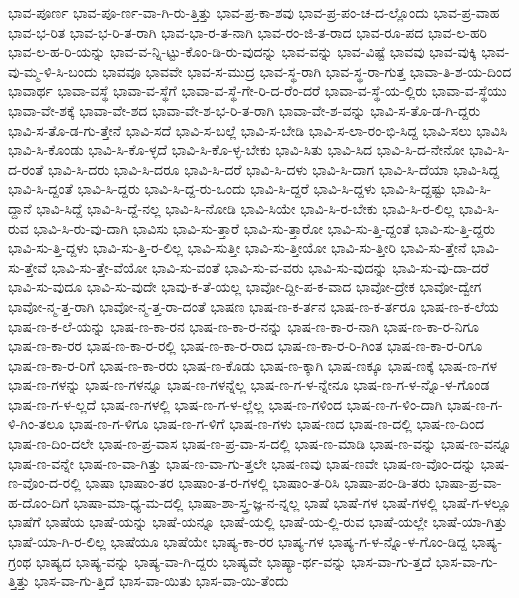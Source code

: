 {ಭಾವ-ಪೂರ್ಣ
ಭಾವ-ಪೂ-ರ್ಣ-ವಾ-ಗಿ-ರು-ತ್ತಿತ್ತು
ಭಾವ-ಪ್ರ-ಕಾ-ಶವು
ಭಾವ-ಪ್ರ-ಪಂ-ಚ-ದ-ಲ್ಲೊಂದು
ಭಾವ-ಪ್ರ-ವಾಹ
ಭಾವ-ಭ-ರಿತ
ಭಾವ-ಭ-ರಿ-ತ-ರಾಗಿ
ಭಾವ-ಭಾ-ರ-ತ-ನಾಗಿ
ಭಾವ-ರಂ-ಜಿ-ತ-ರಾದ
ಭಾವ-ರೂ-ಪದ
ಭಾವ-ಲ-ಹರಿ
ಭಾವ-ಲ-ಹ-ರಿ-ಯನ್ನು
ಭಾವ-ವ-ನ್ನಿ-ಟ್ಟು-ಕೊಂ-ಡಿ-ರು-ವುದನ್ನು
ಭಾವ-ವನ್ನು
ಭಾವ-ವಿಷ್ಟೆ
ಭಾವವು
ಭಾವ-ವುಕ್ಕಿ
ಭಾವ-ವು-ಮ್ಮ-ಳಿ-ಸಿ-ಬಂದು
ಭಾವವೂ
ಭಾವವೇ
ಭಾವ-ಸ-ಮುದ್ರ
ಭಾವ-ಸ್ಥ-ರಾಗಿ
ಭಾವ-ಸ್ಥ-ರಾ-ಗುತ್ತ
ಭಾವಾ-ತಿ-ಶ-ಯ-ದಿಂದ
ಭಾವಾರ್ಥ
ಭಾವಾ-ವಸ್ಥೆ
ಭಾವಾ-ವ-ಸ್ಥೆಗೆ
ಭಾವಾ-ವ-ಸ್ಥೆ-ಗೇ-ರಿ-ದ-ರೆಂ-ದರೆ
ಭಾವಾ-ವ-ಸ್ಥೆ-ಯ-ಲ್ಲಿರು
ಭಾವಾ-ವ-ಸ್ಥೆಯು
ಭಾವಾ-ವೇ-ಶಕ್ಕೆ
ಭಾವಾ-ವೇ-ಶದ
ಭಾವಾ-ವೇ-ಶ-ಭ-ರಿ-ತ-ರಾಗಿ
ಭಾವಾ-ವೇ-ಶ-ವನ್ನು
ಭಾವಿ-ಸ-ತೊ-ಡ-ಗಿ-ದ್ದರು
ಭಾವಿ-ಸ-ತೊ-ಡ-ಗು-ತ್ತೇನೆ
ಭಾವಿ-ಸದೆ
ಭಾವಿ-ಸ-ಬಲ್ಲೆ
ಭಾವಿ-ಸ-ಬೇಡಿ
ಭಾವಿ-ಸ-ಲಾ-ರಂ-ಭಿ-ಸಿದ್ದ
ಭಾವಿ-ಸಲು
ಭಾವಿಸಿ
ಭಾವಿ-ಸಿ-ಕೊಂಡು
ಭಾವಿ-ಸಿ-ಕೊ-ಳ್ಳದೆ
ಭಾವಿ-ಸಿ-ಕೊ-ಳ್ಳ-ಬೇಕು
ಭಾವಿ-ಸಿತು
ಭಾವಿ-ಸಿದ
ಭಾವಿ-ಸಿ-ದ-ನೇನೋ
ಭಾವಿ-ಸಿ-ದ-ರಂತೆ
ಭಾವಿ-ಸಿ-ದರು
ಭಾವಿ-ಸಿ-ದರೂ
ಭಾವಿ-ಸಿ-ದರೆ
ಭಾವಿ-ಸಿ-ದಳು
ಭಾವಿ-ಸಿ-ದಾಗ
ಭಾವಿ-ಸಿ-ದೆಯಾ
ಭಾವಿ-ಸಿದ್ದ
ಭಾವಿ-ಸಿ-ದ್ದಂತೆ
ಭಾವಿ-ಸಿ-ದ್ದರು
ಭಾವಿ-ಸಿ-ದ್ದ-ರು-ಒಂದು
ಭಾವಿ-ಸಿ-ದ್ದರೆ
ಭಾವಿ-ಸಿ-ದ್ದಳು
ಭಾವಿ-ಸಿ-ದ್ದಷ್ಟು
ಭಾವಿ-ಸಿ-ದ್ದಾನೆ
ಭಾವಿ-ಸಿದ್ದೆ
ಭಾವಿ-ಸಿ-ದ್ದೆ-ನಲ್ಲ
ಭಾವಿ-ಸಿ-ನೋಡಿ
ಭಾವಿ-ಸಿಯೇ
ಭಾವಿ-ಸಿ-ರ-ಬೇಕು
ಭಾವಿ-ಸಿ-ರ-ಲಿಲ್ಲ
ಭಾವಿ-ಸಿ-ರುವ
ಭಾವಿ-ಸಿ-ರು-ವು-ದಾಗಿ
ಭಾವಿಸು
ಭಾವಿ-ಸು-ತ್ತಾರೆ
ಭಾವಿ-ಸು-ತ್ತಾರೋ
ಭಾವಿ-ಸು-ತ್ತಿ-ದ್ದಂತೆ
ಭಾವಿ-ಸು-ತ್ತಿ-ದ್ದರು
ಭಾವಿ-ಸು-ತ್ತಿ-ದ್ದಳು
ಭಾವಿ-ಸು-ತ್ತಿ-ರ-ಲಿಲ್ಲ
ಭಾವಿ-ಸುತ್ತೀ
ಭಾವಿ-ಸು-ತ್ತೀಯೋ
ಭಾವಿ-ಸು-ತ್ತೀರಿ
ಭಾವಿ-ಸು-ತ್ತೇನೆ
ಭಾವಿ-ಸು-ತ್ತೇವೆ
ಭಾವಿ-ಸು-ತ್ತೇ-ವೆಯೋ
ಭಾವಿ-ಸು-ವಂತೆ
ಭಾವಿ-ಸು-ವ-ವರು
ಭಾವಿ-ಸು-ವುದನ್ನು
ಭಾವಿ-ಸು-ವು-ದಾ-ದರೆ
ಭಾವಿ-ಸು-ವುದೂ
ಭಾವಿ-ಸು-ವುದೇ
ಭಾವು-ಕ-ತೆ-ಯಲ್ಲ
ಭಾವೋ-ದ್ದೀ-ಪ-ಕ-ವಾದ
ಭಾವೋ-ದ್ರೇಕ
ಭಾವೋ-ದ್ವೇಗ
ಭಾವೋ-ನ್ಮ-ತ್ತ-ರಾಗಿ
ಭಾವೋ-ನ್ಮ-ತ್ತ-ರಾ-ದಂತೆ
ಭಾಷಣ
ಭಾಷ-ಣ-ಕ-ರ್ತನ
ಭಾಷ-ಣ-ಕ-ರ್ತರೂ
ಭಾಷ-ಣ-ಕ-ಲೆಯ
ಭಾಷ-ಣ-ಕ-ಲೆ-ಯನ್ನು
ಭಾಷ-ಣ-ಕಾ-ರನ
ಭಾಷ-ಣ-ಕಾ-ರ-ನನ್ನು
ಭಾಷ-ಣ-ಕಾ-ರ-ನಾಗಿ
ಭಾಷ-ಣ-ಕಾ-ರ-ನಿಗೂ
ಭಾಷ-ಣ-ಕಾ-ರರ
ಭಾಷ-ಣ-ಕಾ-ರ-ರಲ್ಲಿ
ಭಾಷ-ಣ-ಕಾ-ರ-ರಾದ
ಭಾಷ-ಣ-ಕಾ-ರ-ರಿ-ಗಿಂತ
ಭಾಷ-ಣ-ಕಾ-ರ-ರಿಗೂ
ಭಾಷ-ಣ-ಕಾ-ರ-ರಿಗೆ
ಭಾಷ-ಣ-ಕಾ-ರರು
ಭಾಷ-ಣ-ಕೊಡು
ಭಾಷ-ಣ-ಕ್ಕಾಗಿ
ಭಾಷ-ಣಕ್ಕೂ
ಭಾಷ-ಣಕ್ಕೆ
ಭಾಷ-ಣ-ಗಳ
ಭಾಷ-ಣ-ಗಳನ್ನು
ಭಾಷ-ಣ-ಗಳನ್ನೂ
ಭಾಷ-ಣ-ಗಳನ್ನೆಲ್ಲ
ಭಾಷ-ಣ-ಗ-ಳ-ನ್ನೇನೂ
ಭಾಷ-ಣ-ಗ-ಳ-ನ್ನೊ-ಳ-ಗೊಂಡ
ಭಾಷ-ಣ-ಗ-ಳ-ಲ್ಲದೆ
ಭಾಷ-ಣ-ಗಳಲ್ಲಿ
ಭಾಷ-ಣ-ಗ-ಳ-ಲ್ಲೆಲ್ಲ
ಭಾಷ-ಣ-ಗಳಿಂದ
ಭಾಷ-ಣ-ಗ-ಳಿಂ-ದಾಗಿ
ಭಾಷ-ಣ-ಗ-ಳಿ-ಗಿಂ-ತಲೂ
ಭಾಷ-ಣ-ಗ-ಳಿಗೂ
ಭಾಷ-ಣ-ಗ-ಳಿಗೆ
ಭಾಷ-ಣ-ಗಳು
ಭಾಷ-ಣದ
ಭಾಷ-ಣ-ದಲ್ಲಿ
ಭಾಷ-ಣ-ದಿಂದ
ಭಾಷ-ಣ-ದಿಂ-ದಲೇ
ಭಾಷ-ಣ-ಪ್ರ-ವಾಸ
ಭಾಷ-ಣ-ಪ್ರ-ವಾ-ಸ-ದಲ್ಲಿ
ಭಾಷ-ಣ-ಮಾಡಿ
ಭಾಷ-ಣ-ವನ್ನು
ಭಾಷ-ಣ-ವನ್ನೂ
ಭಾಷ-ಣ-ವನ್ನೇ
ಭಾಷ-ಣ-ವಾ-ಗಿತ್ತು
ಭಾಷ-ಣ-ವಾ-ಗು-ತ್ತಲೇ
ಭಾಷ-ಣವು
ಭಾಷ-ಣವೇ
ಭಾಷ-ಣ-ವೊಂ-ದನ್ನು
ಭಾಷ-ಣ-ವೊಂ-ದ-ರಲ್ಲಿ
ಭಾಷಾ
ಭಾಷಾಂ-ತರ
ಭಾಷಾಂ-ತ-ರ-ಗಳಲ್ಲಿ
ಭಾಷಾಂ-ತ-ರಿಸಿ
ಭಾಷಾ-ಪಂ-ಡಿ-ತರು
ಭಾಷಾ-ಪ್ರ-ವಾ-ಹ-ದೊಂ-ದಿಗೆ
ಭಾಷಾ-ಮಾ-ಧ್ಯ-ಮ-ದಲ್ಲಿ
ಭಾಷಾ-ಶಾ-ಸ್ತ್ರ-ಜ್ಞ-ನ-ನ್ನಲ್ಲ
ಭಾಷೆ
ಭಾಷೆ-ಗಳ
ಭಾಷೆ-ಗಳಲ್ಲಿ
ಭಾಷೆ-ಗ-ಳಲ್ಲೂ
ಭಾಷೆಗೆ
ಭಾಷೆಯ
ಭಾಷೆ-ಯನ್ನು
ಭಾಷೆ-ಯನ್ನೂ
ಭಾಷೆ-ಯಲ್ಲಿ
ಭಾಷೆ-ಯ-ಲ್ಲಿ-ರುವ
ಭಾಷೆ-ಯಲ್ಲೇ
ಭಾಷೆ-ಯಾ-ಗಿತ್ತು
ಭಾಷೆ-ಯಾ-ಗಿ-ರ-ಲಿಲ್ಲ
ಭಾಷೆಯೂ
ಭಾಷೆಯೇ
ಭಾಷ್ಯ-ಕಾ-ರರ
ಭಾಷ್ಯ-ಗಳ
ಭಾಷ್ಯ-ಗ-ಳ-ನ್ನೊ-ಳ-ಗೊಂ-ಡಿದ್ದ
ಭಾಷ್ಯ-ಗ್ರಂಥ
ಭಾಷ್ಯದ
ಭಾಷ್ಯ-ವನ್ನು
ಭಾಷ್ಯ-ವಾ-ಗಿ-ದ್ದರು
ಭಾಷ್ಯವೇ
ಭಾಷ್ಯಾ-ರ್ಥ-ವನ್ನು
ಭಾಸ-ವಾ-ಗು-ತ್ತದೆ
ಭಾಸ-ವಾ-ಗು-ತ್ತಿತ್ತು
ಭಾಸ-ವಾ-ಗು-ತ್ತಿದೆ
ಭಾಸ-ವಾ-ಯಿತು
ಭಾಸ-ವಾ-ಯಿ-ತೆಂದು
}
